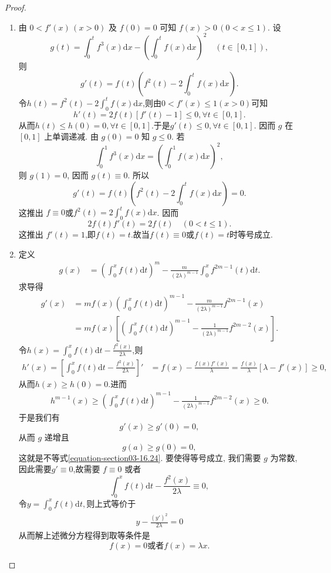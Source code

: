 \documentclass[../../main.tex]{subfiles}%
\begin{document}
\begin{proof}
\begin{enumerate}
\item 由 $0<f'(x)\,(x>0)$ 及 $f(0)=0$ 可知 $f(x)>0\,(0<x\leqslant 1)$. 设
$$g(t)=\int_0^t f^3(x)\mathrm{d}x-\left(\int_0^t f(x)\mathrm{d}x\right)^2\quad(t\in[0,1]),$$
则
$$g'(t)=f(t)\left(f^2(t)-2\int_0^t f(x)\mathrm{d}x\right).$$
令$h(t)=f^2(t)-2\int_0^t f(x)\mathrm{d}x$,则由$0<f'(x)\leqslant 1(x>0)$可知
\[
h' \left( t \right) =2f\left( t \right) \left[ f' \left( t \right) -1 \right] \leqslant 0,\forall t\in \left[ 0,1 \right] .
\]
从而$h(t)\leqslant h(0)=0,\forall t\in \left[ 0,1 \right] $.于是$g'(t)\leqslant 0,\forall t\in \left[ 0,1 \right]$.
因而 $g$ 在 $[0,1]$ 上单调递减. 由 $g(0)=0$ 知 $g\leqslant 0$. 若
$$\int_0^1 f^3(x)\mathrm{d}x=\left(\int_0^1 f(x)\mathrm{d}x\right)^2,$$
则 $g(1)=0$, 因而 $g(t)\equiv0$. 所以
$$g'(t)=f(t)\left(f^2(t)-2\int_0^t f(x)\mathrm{d}x\right)=0.$$
这推出 $f\equiv 0$或$f^2(t)=2\int_0^t f(x)\mathrm{d}x$. 因而
$$2f(t)f'(t)=2f(t)\quad(0<t\leqslant 1).$$
这推出 $f'(t)=1$,即$f(t)=t$.故当$f(t)\equiv 0$或$f(t)=t$时等号成立.

\item 定义
\begin{align*}
g(x) &= \left(\int_{0}^{x}f(t)\mathrm{d}t\right)^m - \frac{m}{(2\lambda)^{m - 1}}\int_{0}^{x}f^{2m - 1}(t)\mathrm{d}t.
\end{align*}
求导得
\begin{align*}
g'(x) &= mf(x)\left(\int_{0}^{x}f(t)\mathrm{d}t\right)^{m - 1} - \frac{m}{(2\lambda)^{m - 1}}f^{2m - 1}(x)\\
&= mf(x)\left[\left(\int_{0}^{x}f(t)\mathrm{d}t\right)^{m - 1} - \frac{1}{(2\lambda)^{m - 1}}f^{2m - 2}(x)\right].
\end{align*}
令$h(x)=\int_{0}^{x}f(t)\mathrm{d}t - \frac{f^2(x)}{2\lambda}$,则
\begin{align*}
h'(x)=\left[\int_{0}^{x}f(t)\mathrm{d}t - \frac{f^2(x)}{2\lambda}\right]' &= f(x) - \frac{f(x)f'(x)}{\lambda} = \frac{f(x)}{\lambda}[\lambda - f'(x)] \geqslant 0,
\end{align*}
从而$h(x)\geqslant  h(0)=0.$进而
\begin{align*}
h^{m-1}(x)\geqslant \left(\int_{0}^{x}f(t)\mathrm{d}t\right)^{m - 1} - \frac{1}{(2\lambda)^{m - 1}}f^{2m - 2}(x)\geqslant 0.
\end{align*}
于是我们有
\[g'(x) \geqslant g'(0) = 0,\]
从而 $g$ 递增且
\[g(a) \geqslant g(0) = 0,\]
这就是不等式\eqref{equation-section03-16.24}.
要使得等号成立, 我们需要 $g$ 为常数, 因此需要$g'\equiv 0$,故需要 $f \equiv 0$ 或者
\[\int_{0}^{x}f(t)\mathrm{d}t - \frac{f^2(x)}{2\lambda} \equiv 0,\]
令$y=\int_{0}^{x}f(t)\mathrm{d}t,$则上式等价于
\begin{align*}
y-\frac{(y')^2}{2\lambda}=0
\end{align*}
从而解上述微分方程得到取等条件是
\[f(x) = 0\text{或者}f(x) = \lambda x.\]
\end{enumerate}

\end{proof}
\end{document}
